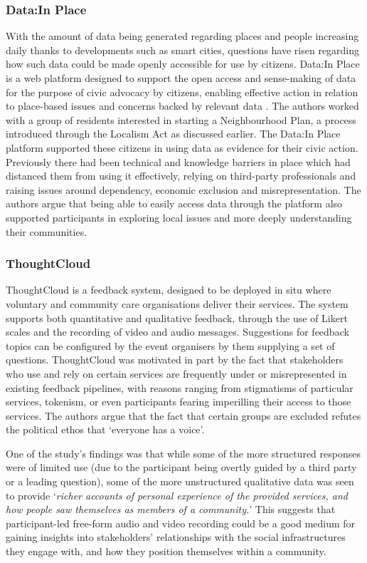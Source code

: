 \subsubsection{Data:In Place}
With the amount of data being generated regarding places and people increasing daily thanks to developments such as smart cities, questions have risen regarding how such data could be made openly accessible for use by citizens. Data:In Place is a web platform designed to support the open access and sense-making of data for the purpose of civic advocacy by citizens, enabling effective action in relation to place-based issues and concerns backed by relevant data \citep{Puussaar2018}. The authors worked with a group of residents interested in starting a Neighbourhood Plan, a process introduced through the Localism Act as discussed earlier. The Data:In Place platform supported these citizens in using data as evidence for their civic action. Previously there had been technical and knowledge barriers in place which had distanced them from using it effectively, relying on third-party professionals and raising issues around dependency, economic exclusion and misrepresentation. The authors argue that being able to easily access data through the platform also supported participants in exploring local issues and more deeply understanding their communities.

\subsubsection{ThoughtCloud}

ThoughtCloud \citep{Dow2016} is a feedback system, designed to be deployed in situ where voluntary and community care organisations deliver their services. The system supports both quantitative and qualitative feedback, through the use of Likert scales and the recording of video and audio messages. Suggestions for feedback topics can be configured by the event organisers by them supplying a set of questions. ThoughtCloud was motivated in part by the fact that stakeholders who use and rely on certain services are frequently under or misrepresented in existing feedback pipelines, with reasons ranging from stigmatisms of particular services, tokenism, or even participants fearing imperilling their access to those services. The authors argue that the fact that certain groups are excluded refutes the political ethos that `everyone has a voice'.

One of the study's findings was that while some of the more structured responses were of limited use (due to the participant being overtly guided by a third party or a leading question), some of the more unstructured qualitative data was seen to provide `\textit{richer accounts of personal experience of the provided services, and how people saw themselves as members of a community.}' This suggests that participant-led free-form audio and video recording could be a good medium for gaining insights into stakeholders' relationships with the social infrastructures they engage with, and how they position themselves within a community.

